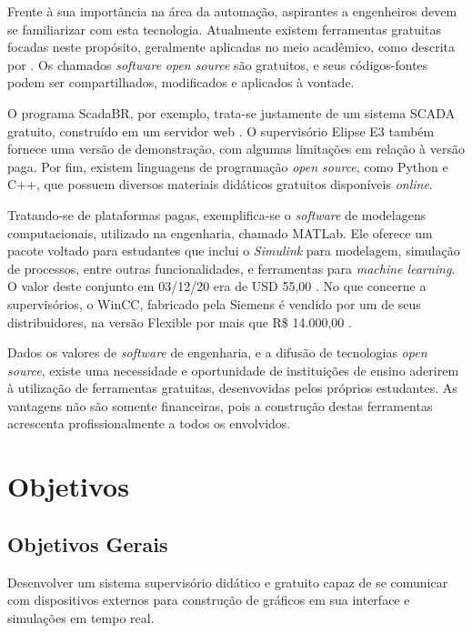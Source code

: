 Frente à sua importância na área da automação, aspirantes a engenheiros devem se familiarizar com esta tecnologia. Atualmente existem ferramentas gratuitas focadas neste propósito, geralmente aplicadas no meio acadêmico, como descrita por . Os chamados \emph{software} \emph{open source} são gratuitos, e seus códigos-fontes podem ser compartilhados, modificados e aplicados à vontade.

O programa ScadaBR, por exemplo, trata-se justamente de um sistema SCADA gratuito, construído em um servidor web \cite{silva2013}. O supervisório Elipse E3 também fornece uma versão de demonstração, com algumas limitações em relação à versão paga. Por fim, existem linguagens de programação \emph{open source}, como Python e C++, que possuem diversos materiais didáticos gratuitos disponíveis \emph{online}.

Tratando-se de plataformas pagas, exemplifica-se o \textit{software} de modelagens computacionais, utilizado na engenharia, chamado MATLab\textsuperscript{\tiny \textregistered}. Ele oferece um pacote voltado para estudantes que inclui o \emph{Simulink} para modelagem, simulação de processos, entre outras funcionalidades, e ferramentas para \emph{machine learning}. O valor deste conjunto em 03/12/20 era de USD 55,00 \cite{MathWorks}. No que concerne a supervisórios, o WinCC, fabricado pela Siemens é vendido por um de seus distribuidores, na versão Flexible por mais que R\$ 14.000,00 \cite{SHMR}.
	
Dados os valores de \textit{software} de engenharia, e a difusão de tecnologias \emph{open source}, existe uma necessidade e oportunidade de instituições de ensino aderirem à utilização de ferramentas gratuitas, desenvovidas pelos próprios estudantes. As vantagens não são somente financeiras, pois a construção destas ferramentas acrescenta profissionalmente a todos os envolvidos.

\section{Objetivos}

\subsection{Objetivos Gerais}

Desenvolver um sistema supervisório didático e gratuito capaz de se comunicar com dispositivos externos para construção de gráficos em sua interface e simulações em tempo real.


